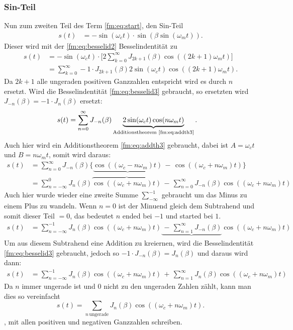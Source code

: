 \subsubsection{Sin-Teil}
Nun zum zweiten Teil des Term \eqref{fm:eq:start}, den Sin-Teil
\begin{align*}
    s(t) 
    &=
    -\sin(\omega_c t)\cdot\sin(\beta\sin(\omega_m t)).
\end{align*}
Dieser wird mit der \eqref{fm:eq:besselid2} Besselindentität zu
\begin{align*}
    s(t) 
    &=
    -\sin(\omega_c t) \cdot \bigg[ 2 \sum_{k=0}^\infty J_{ 2k + 1}(\beta) \cos(( 2k + 1) \omega_m t) \bigg]
    \\
    &=
    \sum_{k=0}^\infty -1 \cdot J_{2k+1}(\beta) 2\sin(\omega_c t)\cos((2k+1)\omega_m t).
\end{align*}
Da \(2k + 1\) alle ungeraden positiven Ganzzahlen entspricht wird es durch \(n\) ersetzt. 
Wird die Besselindentität \eqref{fm:eq:besselid3} gebraucht, so ersetzten wird \(J_{-n}(\beta) = -1\cdot J_n(\beta)\) ersetzt:
\begin{align*}
    s(t)
    &=
    \sum_{n=0}^\infty J_{-n}(\beta) \underbrace{2\sin(\omega_c t)\cos(n \omega_m t)}_{\text{Additionstheorem \eqref{fm:eq:addth3}}}.
\end{align*}
Auch hier wird ein Additionstheorem \eqref{fm:eq:addth3} gebraucht, dabei ist \(A = \omega_c t\) und \(B = n \omega_m t \), 
somit wird daraus:
\begin{align*}
    s(t)
    &=
    \sum_{n=0}^\infty J_{-n}(\beta) \{ \underbrace{\cos((\omega_c - n\omega_m) t)} \,-\, \cos((\omega_c + n\omega_m) t) \}
    \\
    &=
   \sum_{n=- \infty}^{0} J_{n}(\beta)  \overbrace{\cos((\omega_c + n \omega_m) t)}
   \,-\, \sum_{n=0}^\infty J_{-n}(\beta) \cos((\omega_c + n\omega_m) t)
\end{align*}
Auch hier wurde wieder eine zweite Summe \(\sum_{-\infty}^{-1}\) gebraucht um das Minus zu einem Plus zu wandeln.
Wenn \(n = 0 \) ist der Minuend gleich dem Subtrahend und somit dieser Teil \(=0\), das bedeutet \(n\) ended bei \(-1\) und started bei \(1\).
\begin{align*}
    s(t)
    &=
    \sum_{n=- \infty}^{-1} J_{n}(\beta)  \cos((\omega_c + n \omega_m) t)
    \underbrace{\,-\, \sum_{n=1}^\infty J_{-n}(\beta)} \cos((\omega_c + n\omega_m) t)
\end{align*}
Um aus diesem Subtrahend eine Addition zu kreiernen, wird die Besselindentität \eqref{fm:eq:besselid3} gebraucht, 
jedoch so \(-1 \cdot J_{-n}(\beta) = J_n(\beta)\) und daraus wird dann:
\begin{align*}
    s(t)
    &=
    \sum_{n=- \infty}^{-1} J_{n}(\beta)  \cos((\omega_c + n \omega_m) t)
    \,+\, \sum_{n=1}^\infty J_{n}(\beta) \cos((\omega_c + n\omega_m) t)
\end{align*}
Da \(n\) immer ungerade ist und \(0\) nicht zu den ungeraden Zahlen zählt, kann man dies so vereinfacht 
\[
    s(t)
    =
    \sum_{n\, \text{ungerade}} J_{n}(\beta) \cos((\omega_c + n\omega_m) t).
    \label{fm:eq:ungerade}
\]
, mit allen positiven und negativen Ganzzahlen schreiben.
